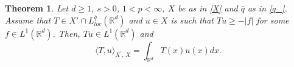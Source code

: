 \documentclass[letterpaper, 11pt,  reqno]{amsart}
\newtheorem{theorem}{Theorem}[section]
\theoremstyle{definition}
\theoremstyle{remark}
\numberwithin{equation}{section}
\newcommand{\bbr}{\mathbb{R}}
\newcommand{\R}{{\mathbb R}}
\begin{document}
	
	\begin{theorem}\label{integr_alpha_big}
Let $d\ge 1$,  $s>0$, $1<p<\infty$, $X$  be as in \eqref{X} and $\bar{q}$ as in \eqref{q_}. Assume that $T\in X{'}\cap L_{loc}^{\bar{q}}(\bbr^d)$ and $u\in X$ is such that $Tu\ge -|f|$  for some  $f\in L^{1}(\bbr^d)$. Then, $Tu\in L^{1}(\bbr^d)$ and 
		$$\langle T,u \rangle_{X^{'}\!,\,X}=\int_{\bbr^d}T(x)u(x)dx.$$
	\end{theorem}
\end{document}
